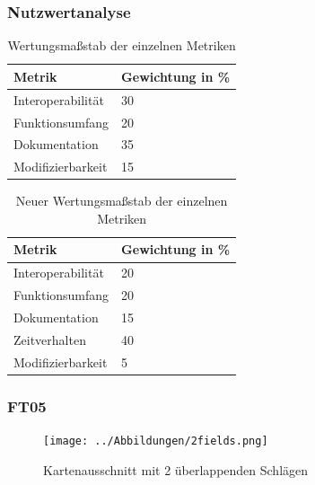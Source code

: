 \documentclass{beamer}
\begin{document}
\begin{frame}\frametitle{Nutzwertanalyse}
\begin{table}
\begin{tabular}{|l|l|}
\hline
\textbf{Metrik} & \textbf{Gewichtung in \%} \\ \hline
Interoperabilität & 30 \\ \hline
Funktionsumfang & 20 \\ \hline
Dokumentation & 35 \\ \hline
Modifizierbarkeit & 15 \\ \hline
\end{tabular}
\caption{Wertungsmaßstab der einzelnen Metriken}
\end{table}

\begin{table}
\begin{tabular}{|l|l|}
\hline
\textbf{Metrik} & \textbf{Gewichtung in \%} \\ \hline
Interoperabilität & 20 \\ \hline
Funktionsumfang & 20 \\ \hline
Dokumentation & 15 \\ \hline
Zeitverhalten & 40 \\ \hline
Modifizierbarkeit & 5 \\ \hline
\end{tabular}
\caption{Neuer Wertungsmaßstab der einzelnen Metriken}
\end{table}
\end{frame}

\begin{frame}\frametitle{FT05}
\begin{figure}
\texttt{[image: ../Abbildungen/2fields.png]}
\caption[Kartenausschnitt mit 2 überlappenden Schlägen]{Kartenausschnitt mit 2 überlappenden Schlägen}
\end{figure}
\end{frame}
\end{document}
